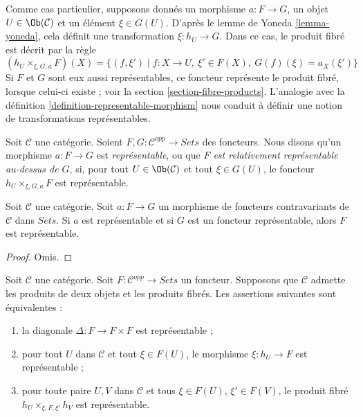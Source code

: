 \noindent
Comme cas particulier, supposons donnés un morphisme
$a : F \to G$, un objet $U \in \Ob(\mathcal{C})$
et un élément $\xi \in G(U)$. D'après le
lemme de Yoneda \ref{lemma-yoneda}, cela définit une transformation
$\xi : h_U \to G$. Dans ce cas, le produit fibré est décrit par la règle
$$
(h_U \times_{\xi, G, a} F)(X) =
\{ (f, \xi') \mid f : X \to U, \ \xi' \in F(X), \ G(f)(\xi) = a_X(\xi')\}
$$
Si $F$ et $G$ sont eux aussi représentables, ce foncteur représente le
produit fibré, lorsque celui-ci existe ; voir la
section \ref{section-fibre-products}.
L'analogie avec la définition \ref{definition-representable-morphism}
nous conduit à définir une notion de transformations représentables.

\begin{definition}
\label{definition-representable-map-presheaves}
Soit $\mathcal{C}$ une catégorie.
Soient $F, G : \mathcal{C}^{opp} \to \textit{Sets}$
des foncteurs. Nous disons qu'un morphisme $a : F \to G$ est
{\it représentable}, ou que {\it $F$ est relativement représentable
au-dessus de $G$}, si, pour tout $U \in \Ob(\mathcal{C})$
et tout $\xi \in G(U)$, le foncteur
$h_U \times_{\xi, G, a} F$ est représentable.
\end{definition}

\begin{lemma}
\label{lemma-representable-over-representable}
Soit $\mathcal{C}$ une catégorie.
Soit $a : F \to G$ un morphisme de foncteurs contravariants
de $\mathcal{C}$ dans $\textit{Sets}$. Si $a$ est représentable
et si $G$ est un foncteur représentable, alors $F$ est représentable.
\end{lemma}

\begin{proof}
Omis.
\end{proof}

\begin{lemma}
\label{lemma-representable-diagonal}
Soit $\mathcal{C}$ une catégorie.
Soit $F : \mathcal{C}^{opp} \to \textit{Sets}$ un foncteur.
Supposons que $\mathcal{C}$ admette les produits de deux objets et les
produits fibrés. Les assertions suivantes sont équivalentes :
\begin{enumerate}
\item la diagonale $\Delta : F \to F \times F$ est représentable ;
\item pour tout $U$ dans $\mathcal{C}$
et tout $\xi \in F(U)$, le morphisme $\xi : h_U \to F$ est représentable ;
\item pour toute paire $U, V$ dans $\mathcal{C}$
et tous $\xi \in F(U)$, $\xi' \in F(V)$, le produit fibré
$h_U \times_{\xi, F, \xi'} h_V$ est représentable.
\end{enumerate}
\end{lemma}

